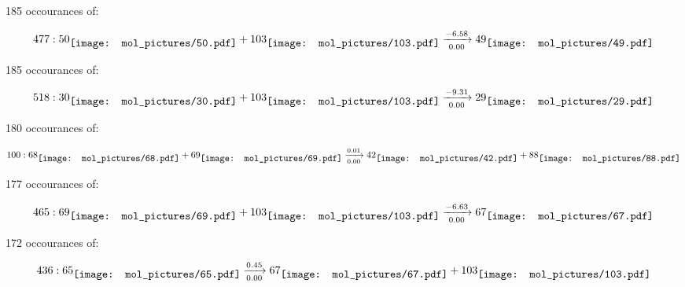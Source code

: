 \documentclass{article}
\begin{document}
\vspace{1cm}


185 occourances of:

$$
477:  
50
\raisebox{-.5\height}{\texttt{[image: mol\_pictures/50.pdf]}}
+
103
\raisebox{-.5\height}{\texttt{[image: mol\_pictures/103.pdf]}}
\xrightarrow[0.00]{-6.58}
49
\raisebox{-.5\height}{\texttt{[image: mol\_pictures/49.pdf]}}
$$



\vspace{1cm}


185 occourances of:

$$
518:  
30
\raisebox{-.5\height}{\texttt{[image: mol\_pictures/30.pdf]}}
+
103
\raisebox{-.5\height}{\texttt{[image: mol\_pictures/103.pdf]}}
\xrightarrow[0.00]{-9.31}
29
\raisebox{-.5\height}{\texttt{[image: mol\_pictures/29.pdf]}}
$$



\vspace{1cm}


180 occourances of:

$$
100:  
68
\raisebox{-.5\height}{\texttt{[image: mol\_pictures/68.pdf]}}
+
69
\raisebox{-.5\height}{\texttt{[image: mol\_pictures/69.pdf]}}
\xrightarrow[0.00]{0.01}
42
\raisebox{-.5\height}{\texttt{[image: mol\_pictures/42.pdf]}}
+
88
\raisebox{-.5\height}{\texttt{[image: mol\_pictures/88.pdf]}}
$$



\vspace{1cm}


177 occourances of:

$$
465:  
69
\raisebox{-.5\height}{\texttt{[image: mol\_pictures/69.pdf]}}
+
103
\raisebox{-.5\height}{\texttt{[image: mol\_pictures/103.pdf]}}
\xrightarrow[0.00]{-6.63}
67
\raisebox{-.5\height}{\texttt{[image: mol\_pictures/67.pdf]}}
$$



\vspace{1cm}


172 occourances of:

$$
436:  
65
\raisebox{-.5\height}{\texttt{[image: mol\_pictures/65.pdf]}}
\xrightarrow[0.00]{0.45}
67
\raisebox{-.5\height}{\texttt{[image: mol\_pictures/67.pdf]}}
+
103
\raisebox{-.5\height}{\texttt{[image: mol\_pictures/103.pdf]}}
$$
\end{document}
